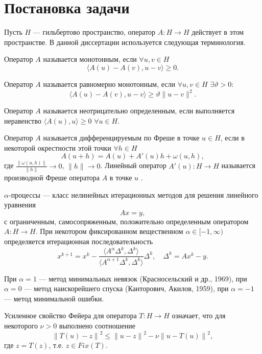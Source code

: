 \section{Постановка задачи}
Пусть $H$ --- гильбертово пространство, оператор $A: H \to H$ действует в этом пространстве. В данной диссертации используется следующая терминология.
\begin{definition}
	Оператор $A$ называется монотонным, если $\forall u,v\in H$ $$\langle A(u)-A(v), u-v\rangle \ge 0.$$
\end{definition}
\begin{definition}
	Оператор $A$ называется равномерно монотонным, если $\forall u,v\in H$ $\exists \vartheta >0\colon$ $$\langle A(u)-A(v), u-v\rangle \ge \vartheta\|u-v\|^2.$$
\end{definition}
\begin{definition}
	Оператор $A$ называется неотрицательно определенным, если выполняется неравенство $\langle A(u), u \rangle \ge 0$ $\forall u\in H$.
\end{definition}
\begin{definition}
	Оператор $A$ называется дифференцируемым по Фреше в точке $u\in H$, если в некоторой окрестности этой точки $\forall h\in H$
	$$A(u+h)=A(u)+A'(u)h+\omega(u,h),$$
	где $\frac{\|\omega(u,h)\|}{\|h\|}\to 0$, $\|h\|\to 0$.
	Линейный оператор $A'(u):H \to H$ называется производной Фреше оператора $A$ в точке $u$ .
\end{definition}
\begin{definition}
	$\alpha$-процессы --- класс нелинейных итерационных методов для решения линейного уравнения
	$$Ax=y,$$
	с ограниченным, самосопряженным, положительно определенным оператором $A:H\to H$. При некотором фиксированном вещественном $\alpha \in [-1, \infty)$ определяется итерационная последовательность
		$$x^{k+1}=x^k-\frac{\langle A^\alpha\Delta^k, \Delta^k \rangle}{\langle A^{\alpha +1}\Delta^k, \Delta^k\rangle}\Delta^k,\quad \Delta^k=Ax^k-y.$$
\end{definition}
При $\alpha=1$ --- метод минимальных невязок (Красносельский и др., 1969), при $\alpha=0$ --- метод наискорейшего спуска (Канторович, Акилов, 1959), при $\alpha=-1$ --- метод минимальной ошибки.
\begin{definition}
	Усиленное свойство Фейера \cite{VasEre2009} для оператора $T: H \to H$ означает, что для некоторого $\nu>0$ выполнено соотношение
	\begin{equation}\label{fejer_prop_uni}
	{\|T(u)-z\|}^2\le{\|u-z\|}^2-\nu{\|u-T(u)\|}^2,
	\end{equation}
	где $z=T(z)$, т.е. $z\in Fix(T)$. 
\end{definition}
